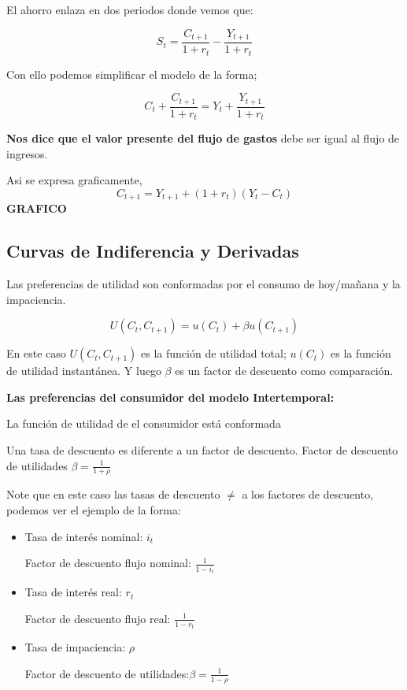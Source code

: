 El ahorro enlaza en dos periodos donde vemos que: 

$$S_{t}=\frac{C_{t+1}}{1+r_{t}}- \frac{Y_{t+1}}{1+r_{t}}$$

Con ello podemos simplificar el modelo de la forma; 

\begin{equation}
    C_{t}+\frac{C_{t+1}}{1+r_{t}} = Y_{t}+ \frac{Y_{t+1}}{1+r_{t}}
\end{equation}

\textbf{Nos dice que el valor presente del flujo de gastos} debe ser igual al flujo de ingresos. 

Asi se expresa graficamente, 
\begin{equation}
    C_{t+1} = Y_{t+1} + (1+r_{t})(Y_{t}-C_{t})
\end{equation}
\textbf{GRAFICO}
\subsection{Curvas de Indiferencia y Derivadas}

Las preferencias de utilidad son conformadas por el consumo de hoy/mañana y la impaciencia.

\begin{equation}
    U(C_{t},C_{t+1}) = u(C_{t})+\beta u(C_{t+1})
\end{equation}

En este caso $U(C_{t},C_{t+1})$ es la función de utilidad total; $u(C_{t})$ es la función de utilidad instantánea. Y luego $\beta$ es un factor de descuento como comparación. 

\textbf{Las preferencias del consumidor del modelo Intertemporal:}

La función de utilidad de el consumidor está conformada 

Una tasa de descuento es diferente a un factor de descuento. Factor de descuento de utilidades $\beta = \frac{1}{1+\rho}$

Note que en este caso las tasas de descuento $\neq$ a los factores de descuento, podemos ver el ejemplo de la forma:
\begin{itemize}
    \item Tasa de interés nominal: $i_{t}$ 
    
    Factor de descuento flujo nominal: $\frac{1}{1-i_{t}}$
    
    \item Tasa de interés real: $r_{t}$ 
    
    Factor de descuento flujo real: $\frac{1}{1-r_{t}}$
    
    \item Tasa de impaciencia: $\rho$ 
    
    Factor de descuento de utilidades:$\beta= \frac{1}{1-\rho}$
\end{itemize}

